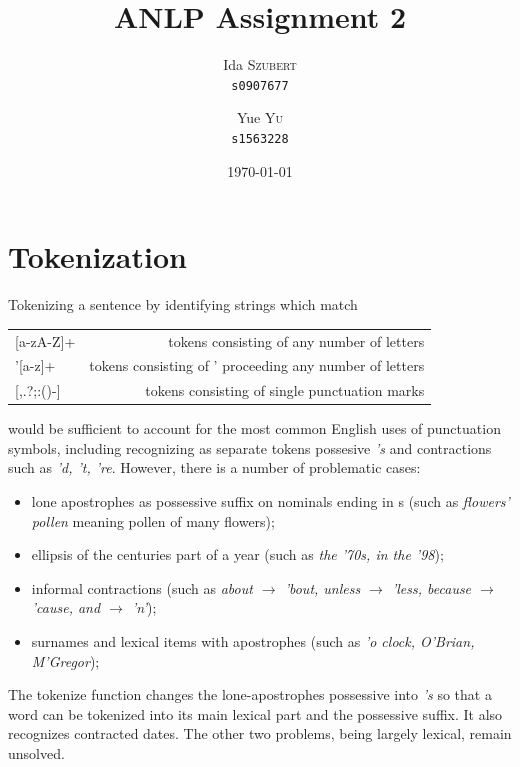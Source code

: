 \documentclass{article}
\title{ANLP Assignment 2} %
\author{
	Ida \textsc{Szubert}\\
	\texttt{s0907677}
	\and
	Yue \textsc{Yu}\\
	\texttt{s1563228}
}
\date{\today} %
\begin{document}
	
\maketitle %

\section{Tokenization}

Tokenizing a sentence by identifying strings which match

\begin{center}
\begin{tabular}{l r}
	{[}a-zA-Z{]}+&tokens consisting of any number of letters\\
	'[a-z]+&tokens consisting of ' proceeding any number of letters\\
	{[},.?;:()-{]}&tokens consisting of single punctuation marks\\
\end{tabular}
\end{center}
would be sufficient to account for the most common English uses of punctuation symbols, including recognizing as separate tokens possesive \emph{'s} and contractions such as \emph{'d, 't, 're}.  However, there is a number of problematic cases:

\begin{itemize}
	\item
	lone apostrophes as possessive suffix on nominals ending in s (such as \emph{flowers' pollen} meaning pollen of many flowers);
	\item
	ellipsis of the centuries part of a year (such as \emph{the '70s, in the '98});
	\item
	informal contractions (such as \emph{about $\rightarrow$ 'bout, unless $\rightarrow$  ’less, because $\rightarrow$  'cause, and $\rightarrow$ 'n'});
	\item
	surnames and lexical items with apostrophes (such as \emph{'o clock, O'Brian, M'Gregor});
\end{itemize}
The tokenize function changes the lone-apostrophes possessive into \emph{'s} so that a word can be tokenized into its main lexical part and the possessive suffix. It also recognizes contracted dates. The other two problems, being largely lexical, remain unsolved.
\end{document}

